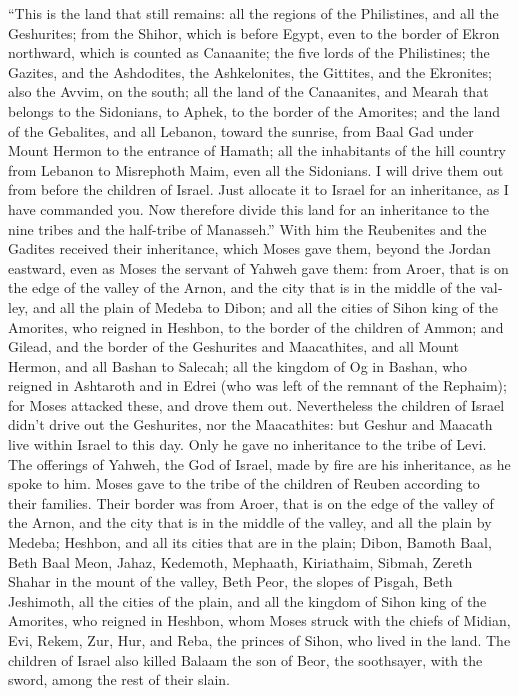 \begin{paracol}{2}
\begin{otherlanguage}{english}
 ``This is the land that still remains: all the regions of
the Philistines, and all the Geshurites;  from the Shihor,
which is before Egypt, even to the border of Ekron northward, which is
counted as Canaanite; the five lords of the Philistines; the Gazites,
and the Ashdodites, the Ashkelonites, the Gittites, and the Ekronites;
also the Avvim,  on the south; all the land of the
Canaanites, and Mearah that belongs to the Sidonians, to Aphek, to the
border of the Amorites;  and the land of the Gebalites,
and all Lebanon, toward the sunrise, from Baal Gad under Mount Hermon to
the entrance of Hamath;  all the inhabitants of the hill
country from Lebanon to Misrephoth Maim, even all the Sidonians. I will
drive them out from before the children of Israel. Just allocate it to
Israel for an inheritance, as I have commanded you.  Now
therefore divide this land for an inheritance to the nine tribes and the
half-tribe of Manasseh.''  With him the Reubenites and the
Gadites received their inheritance, which Moses gave them, beyond the
Jordan eastward, even as Moses the servant of Yahweh gave them:
 from Aroer, that is on the edge of the valley of the
Arnon, and the city that is in the middle of the valley, and all the
plain of Medeba to Dibon;  and all the cities of Sihon
king of the Amorites, who reigned in Heshbon, to the border of the
children of Ammon;  and Gilead, and the border of the
Geshurites and Maacathites, and all Mount Hermon, and all Bashan to
Salecah;  all the kingdom of Og in Bashan, who reigned in
Ashtaroth and in Edrei (who was left of the remnant of the Rephaim); for
Moses attacked these, and drove them out.  Nevertheless
the children of Israel didn't drive out the Geshurites, nor the
Maacathites: but Geshur and Maacath live within Israel to this day.
 Only he gave no inheritance to the tribe of Levi. The
offerings of Yahweh, the God of Israel, made by fire are his
inheritance, as he spoke to him.  Moses gave to the tribe
of the children of Reuben according to their families. 
Their border was from Aroer, that is on the edge of the valley of the
Arnon, and the city that is in the middle of the valley, and all the
plain by Medeba;  Heshbon, and all its cities that are in
the plain; Dibon, Bamoth Baal, Beth Baal Meon,  Jahaz,
Kedemoth, Mephaath,  Kiriathaim, Sibmah, Zereth Shahar in
the mount of the valley,  Beth Peor, the slopes of
Pisgah, Beth Jeshimoth,  all the cities of the plain, and
all the kingdom of Sihon king of the Amorites, who reigned in Heshbon,
whom Moses struck with the chiefs of Midian, Evi, Rekem, Zur, Hur, and
Reba, the princes of Sihon, who lived in the land.  The
children of Israel also killed Balaam the son of Beor, the soothsayer,
with the sword, among the rest of their slain.


\end{otherlanguage}
\end{paracol}
